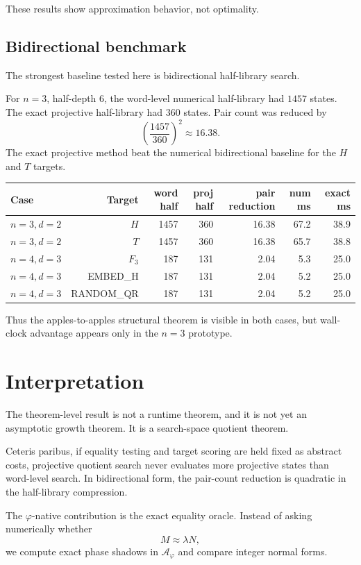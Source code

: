 \documentclass[11pt]{article}
\newcommand{\ph}{\varphi}
\newcommand{\A}{\mathcal A}
\begin{document}
These results show approximation behavior, not optimality.

\subsection{Bidirectional benchmark}

The strongest baseline tested here is bidirectional half-library search.

For $n=3$, half-depth $6$, the word-level numerical half-library had $1457$ states.  The exact projective half-library had $360$ states.  Pair count was reduced by
\[
    \left(\frac{1457}{360}\right)^2\approx 16.38.
\]
The exact projective method beat the numerical bidirectional baseline for the $H$ and $T$ targets.

\begin{center}
\begin{tabular}{lrrrrrr}
\toprule
Case & Target & word half & proj half & pair reduction & num ms & exact ms \\
\midrule
$n=3,d=2$ & $H$ & 1457 & 360 & 16.38 & 67.2 & 38.9 \\
$n=3,d=2$ & $T$ & 1457 & 360 & 16.38 & 65.7 & 38.8 \\
$n=4,d=3$ & $F_3$ & 187 & 131 & 2.04 & 5.3 & 25.0 \\
$n=4,d=3$ & EMBED\_H & 187 & 131 & 2.04 & 5.2 & 25.0 \\
$n=4,d=3$ & RANDOM\_QR & 187 & 131 & 2.04 & 5.2 & 25.0 \\
\bottomrule
\end{tabular}
\end{center}

Thus the apples-to-apples structural theorem is visible in both cases, but wall-clock advantage appears only in the $n=3$ prototype.

\section{Interpretation}

The theorem-level result is not a runtime theorem, and it is not yet an asymptotic growth theorem.  It is a search-space quotient theorem.

Ceteris paribus, if equality testing and target scoring are held fixed as abstract costs, projective quotient search never evaluates more projective states than word-level search.  In bidirectional form, the pair-count reduction is quadratic in the half-library compression.

The $\ph$-native contribution is the exact equality oracle.  Instead of asking numerically whether
\[
    M\approx \lambda N,
\]
we compute exact phase shadows in $\A_\ph$ and compare integer normal forms.
\end{document}
